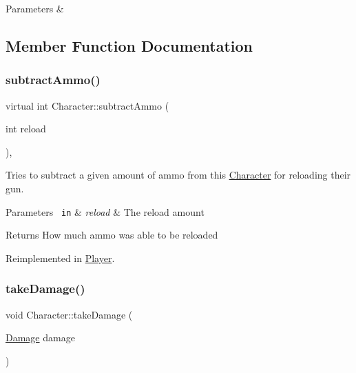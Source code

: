 \begin{DoxyParams}{Parameters}
{\em } & \\
\hline
\end{DoxyParams}


\subsection{Member Function Documentation}
\mbox{\label{class_character_a0b36bcc9509ec1e5d7b6902675edc8f2}} 
\subsubsection{\texorpdfstring{subtractAmmo()}{subtractAmmo()}}
{\footnotesize\ttfamily virtual int Character\+::subtract\+Ammo (\begin{DoxyParamCaption}\item[{int}]{reload }\end{DoxyParamCaption})\hspace{0.3cm}{\ttfamily [inline]}, {\ttfamily [virtual]}}



Tries to subtract a given amount of ammo from this \mbox{\hyperlink{class_character}{Character}} for reloading their gun. 


\begin{DoxyParams}[1]{Parameters}
\mbox{\texttt{ in}}  & {\em reload} & The reload amount\\
\hline
\end{DoxyParams}
\begin{DoxyReturn}{Returns}
How much ammo was able to be reloaded 
\end{DoxyReturn}


Reimplemented in \mbox{\hyperlink{class_player_aeadfd36dc48aea300e4925b8c8f3bd3f}{Player}}.

\mbox{\label{class_character_a3576c31fdd469e24ba63002dc998c352}} 
\subsubsection{\texorpdfstring{takeDamage()}{takeDamage()}}
{\footnotesize\ttfamily void Character\+::take\+Damage (\begin{DoxyParamCaption}\item[{\mbox{\hyperlink{struct_damage}{Damage}}}]{damage }\end{DoxyParamCaption})}



